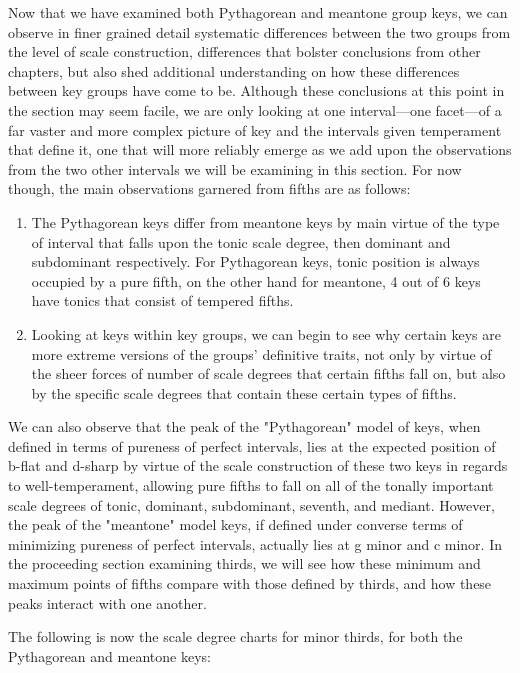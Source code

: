     Now that we have examined both Pythagorean and meantone group keys, we
can observe in finer grained detail systematic differences between the
two groups from the level of scale construction, differences that
bolster conclusions from other chapters, but also shed additional
understanding on how these differences between key groups have come to
be. Although these conclusions at this point in the section may seem
facile, we are only looking at one interval---one facet---of a
far vaster and more complex picture of key and the intervals given
temperament that define it, one that will more reliably emerge as we add
upon the observations from the two other intervals we will be examining
in this section. For now though, the main observations garnered from
fifths are as follows:

\begin{enumerate}
\def\labelenumi{\arabic{enumi}.}
\tightlist
\item
  The Pythagorean keys differ from meantone keys by main virtue of the
  type of interval that falls upon the tonic scale degree, then dominant
  and subdominant respectively. For Pythagorean keys, tonic position is
  always occupied by a pure fifth, on the other hand for meantone, 4 out
  of 6 keys have tonics that consist of tempered fifths.
\item
  Looking at keys within key groups, we can begin to see why certain
  keys are more extreme versions of the groups' definitive traits, not
  only by virtue of the sheer forces of number of scale degrees that
  certain fifths fall on, but also by the specific scale degrees that
  contain these certain types of fifths.
\end{enumerate}

We can also observe that the peak of the "Pythagorean" model of keys,
when defined in terms of pureness of perfect intervals, lies at the
expected position of b-flat and d-sharp by virtue of the scale
construction of these two keys in regards to well-temperament, allowing
pure fifths to fall on all of the tonally important scale degrees of
tonic, dominant, subdominant, seventh, and mediant. However, the peak of
the "meantone" model keys, if defined under converse terms of minimizing
pureness of perfect intervals, actually lies at g minor and c minor. In
the proceeding section examining thirds, we will see how these minimum
and maximum points of fifths compare with those defined by thirds, and
how these peaks interact with one another.

The following is now the scale degree charts for minor thirds, for both
the Pythagorean and meantone keys:




